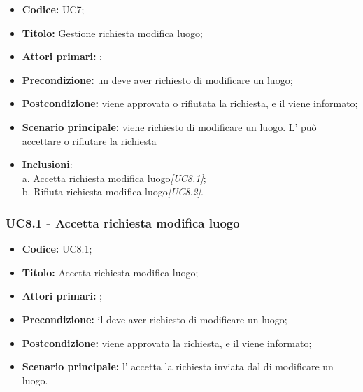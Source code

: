 \documentclass[casi-duso]{subfiles}
\begin{document}
\begin{itemize}
  \item \textbf{Codice:} UC7;
  \item \textbf{Titolo:} Gestione richiesta modifica luogo;
  \item \textbf{Attori primari:} ;
  \item \textbf{Precondizione:} un  deve aver richiesto di modificare un luogo;
  \item \textbf{Postcondizione:} viene approvata o rifiutata la richiesta, e il  viene informato;
  \item \textbf{Scenario principale:} viene richiesto di modificare un luogo. L' può accettare o rifiutare la richiesta
  \item \textbf{Inclusioni}:
        \\a. Accetta richiesta modifica luogo\emph{[UC8.1]};
        \\b. Rifiuta richiesta modifica luogo\emph{[UC8.2]}.

\end{itemize}


\subsubsection{UC8.1 - Accetta richiesta modifica luogo}
\label{subsub:UC8.1}
\begin{itemize}
  \item \textbf{Codice:} UC8.1;
  \item \textbf{Titolo:} Accetta richiesta modifica luogo;
  \item \textbf{Attori primari:} ;
  \item \textbf{Precondizione:} il  deve aver richiesto di modificare un luogo;
  \item \textbf{Postcondizione:} viene approvata la richiesta, e il  viene informato;
  \item \textbf{Scenario principale:} l' accetta la richiesta inviata dal  di modificare un luogo.
\end{itemize}
\end{document}
